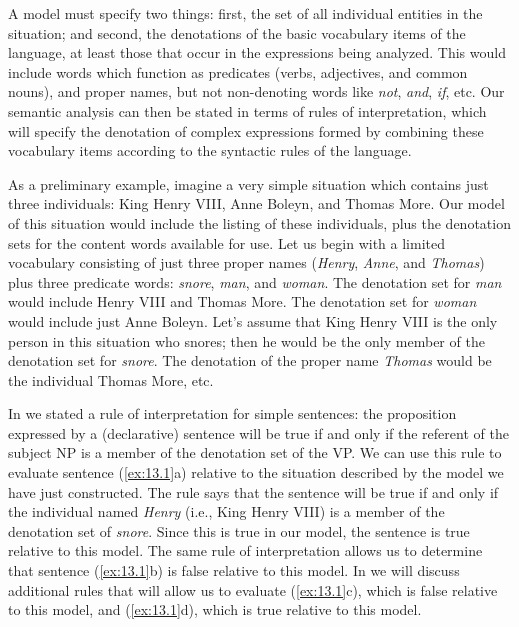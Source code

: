 A model must specify two things: first, the set of all individual entities in the situation; and second, the denotations of the basic vocabulary items of the language, at least those that occur in the expressions being analyzed. This would include words which function as predicates (verbs, adjectives, and common nouns), and proper names, but not non-denoting words like \textit{not}, \textit{and}, \textit{if}, etc. Our semantic analysis can then be stated in terms of rules of interpretation, which will specify the denotation of complex expressions formed by combining these vocabulary items according to the syntactic rules of the language.



As a preliminary example, imagine a very simple situation which contains just three individuals: King Henry VIII, Anne Boleyn, and Thomas More. Our model of this situation would include the listing of these individuals, plus the denotation sets for the content words available for use. Let us begin with a limited vocabulary consisting of just three proper names (\textit{Henry}, \textit{Anne}, and \textit{Thomas}) plus three predicate words: \textit{snore}, \textit{man}, and \textit{woman}. The denotation set for \textit{man} would include Henry VIII and Thomas More. The denotation set for \textit{woman} would include just Anne Boleyn. Let’s assume that King Henry VIII is the only person in this situation who snores; then he would be the only member of the denotation set for \textit{snore}. The denotation of the proper name \textit{Thomas} would be the individual Thomas More, etc.



In  we stated a rule of interpretation for simple sentences: the proposition expressed by a (declarative) sentence will be true if and only if the referent of the subject NP is a member of the denotation set of the VP. We can use this rule to evaluate sentence (\ref{ex:13.1}a) relative to the situation described by the model we have just constructed. The rule says that the sentence will be true if and only if the individual named \textit{Henry} (i.e., King Henry VIII) is a member of the denotation set of \textit{snore}. Since this is true in our model, the sentence is true relative to this model. The same rule of interpretation allows us to determine that sentence (\ref{ex:13.1}b) is false relative to this model. In  we will discuss additional rules that will allow us to evaluate (\ref{ex:13.1}c), which is false relative to this model, and (\ref{ex:13.1}d), which is true relative to this model.


